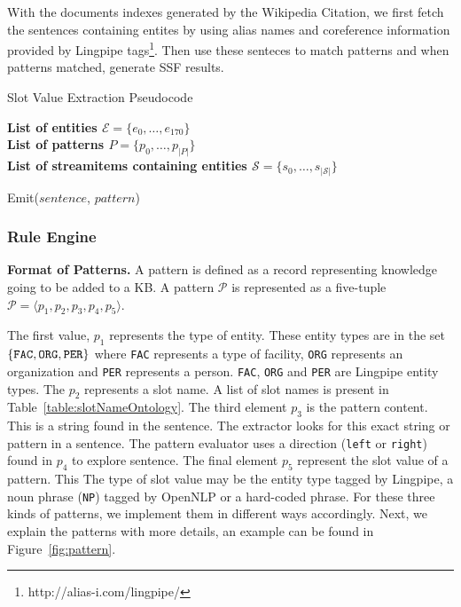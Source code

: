 With the documents indexes generated by the Wikipedia Citation, we first fetch the sentences containing entites by using alias names and coreference information provided by Lingpipe tags\footnote{http://alias-i.com/lingpipe/}. Then use these senteces to match patterns and when patterns matched, generate SSF results.

\begin{algorithm}
  \caption{Slot Value Extraction Pseudocode}
  \textbf{List of entities $\mathcal{E} = \{e_0, \ldots, e_{170}\}$}\\
  \textbf{List of patterns $P = \{p_0, \ldots, p_{|P|}\}$}\\
  \textbf{List of streamitems containing entities $\mathcal{S} = \{s_0, \ldots, s_{|\mathcal{S}|}\}$}\\
  
  \begin{algorithmic}%
                \STATE Emit($sentence$, $pattern$)
              \ENDIF
	    \ENDFOR
          \ENDIF
        \ENDFOR
      \ENDFOR
    \ENDFOR
  \end{algorithmic}
\end{algorithm}


\subsubsection{Rule Engine}

\textbf{Format of Patterns.} A pattern is defined as a record representing knowledge going to be added to a KB. A pattern $\mathcal{P}$ is represented as a five-tuple $\mathcal{P} = \langle p_1, p_2, p_3, p_4, p_5 \rangle$.


The first value, $p_1$ represents the type of entity. These entity types are in the set $\{ \text{\tt FAC}, \text{\tt ORG}, \text{\tt PER} \}$ where \texttt{FAC} represents a type of facility, \texttt{ORG} represents an organization and \texttt{PER} represents a person. \texttt{FAC}, \texttt{ORG} and \texttt{PER} are Lingpipe entity types. The $p_2$ represents a slot name. A list of slot names is present in Table~\ref{table:slotNameOntology}. The third element $p_3$ is the pattern content. This is a string found in the sentence. The extractor looks for this exact string or pattern in a sentence. The pattern evaluator uses a direction (\texttt{left} or \texttt{right}) found in $p_4$ to explore sentence. The final element $p_5$ represent the slot value of a pattern. This %
The type of slot value may be the entity type tagged by Lingpipe, a noun phrase (\texttt{NP}) tagged by OpenNLP or a hard-coded phrase. For these three kinds of patterns, we implement them in different 
ways accordingly. Next, we explain the patterns with more details, an example can be found in Figure~\ref{fig:pattern}. 

